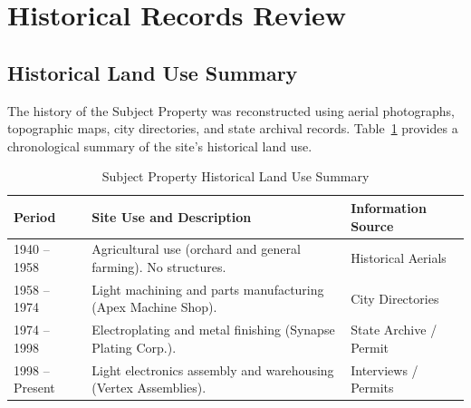 \section{Historical Records Review}

\subsection{Historical Land Use Summary}
The history of the Subject Property was reconstructed using aerial photographs, topographic maps, city directories, and state archival records. Table~\ref{tab:history} provides a chronological summary of the site's historical land use.

\begin{table}[h]
\centering
\caption{Subject Property Historical Land Use Summary}
\begin{tabularx}{\textwidth}{l X p{3cm}}
\toprule
\textbf{Period} & \textbf{Site Use and Description} & \textbf{Information Source} \\
\midrule
1940 -- 1958 & Agricultural use (orchard and general farming). No structures. & Historical Aerials \\
1958 -- 1974 & Light machining and parts manufacturing (Apex Machine Shop). & City Directories \\
1974 -- 1998 & Electroplating and metal finishing (Synapse Plating Corp.). & State Archive / Permit \\
1998 -- Present & Light electronics assembly and warehousing (Vertex Assemblies). & Interviews / Permits \\
\bottomrule
\end{tabularx}
\label{tab:history}
\end{table}

